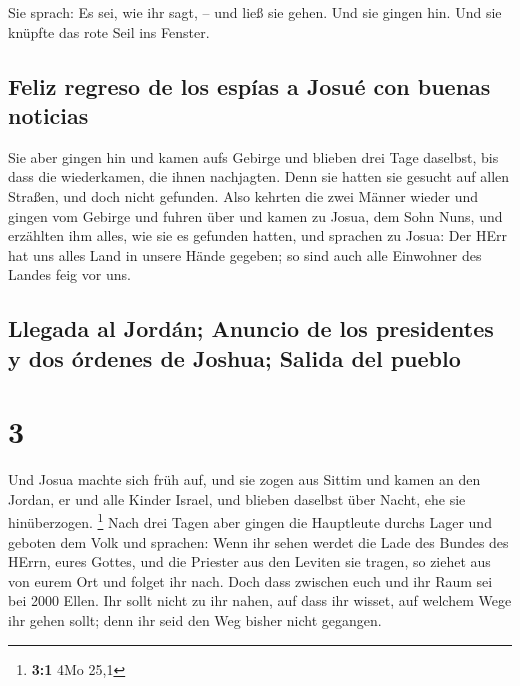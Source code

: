 Sie sprach: Es sei, wie ihr sagt, -- und ließ sie gehen.
Und sie gingen hin. Und sie knüpfte das rote Seil ins Fenster.

\hypertarget{feliz-regreso-de-los-espuxedas-a-josuuxe9-con-buenas-noticias}{%
\subsection{Feliz regreso de los espías a Josué con buenas
noticias}\label{feliz-regreso-de-los-espuxedas-a-josuuxe9-con-buenas-noticias}}

 Sie aber gingen hin und kamen aufs Gebirge und blieben
drei Tage daselbst, bis dass die wiederkamen, die ihnen nachjagten. Denn
sie hatten sie gesucht auf allen Straßen, und doch nicht gefunden.
 Also kehrten die zwei Männer wieder und gingen vom
Gebirge und fuhren über und kamen zu Josua, dem Sohn Nuns, und erzählten
ihm alles, wie sie es gefunden hatten,  und sprachen zu
Josua: Der HErr hat uns alles Land in unsere Hände gegeben; so sind auch
alle Einwohner des Landes feig vor uns.

\hypertarget{llegada-al-jorduxe1n-anuncio-de-los-presidentes-y-dos-uxf3rdenes-de-joshua-salida-del-pueblo}{%
\subsection{Llegada al Jordán; Anuncio de los presidentes y dos órdenes
de Joshua; Salida del
pueblo}\label{llegada-al-jorduxe1n-anuncio-de-los-presidentes-y-dos-uxf3rdenes-de-joshua-salida-del-pueblo}}

\hypertarget{section-2}{%
\section{3}\label{section-2}}

 Und Josua machte sich früh auf, und sie zogen aus Sittim
und kamen an den Jordan, er und alle Kinder Israel, und blieben daselbst
über Nacht, ehe sie hinüberzogen. \footnote{\textbf{3:1} 4Mo 25,1}
 Nach drei Tagen aber gingen die Hauptleute durchs Lager
 und geboten dem Volk und sprachen: Wenn ihr sehen werdet
die Lade des Bundes des HErrn, eures Gottes, und die Priester aus den
Leviten sie tragen, so ziehet aus von eurem Ort und folget ihr nach.
 Doch dass zwischen euch und ihr Raum sei bei 2000 Ellen.
Ihr sollt nicht zu ihr nahen, auf dass ihr wisset, auf welchem Wege ihr
gehen sollt; denn ihr seid den Weg bisher nicht gegangen.

